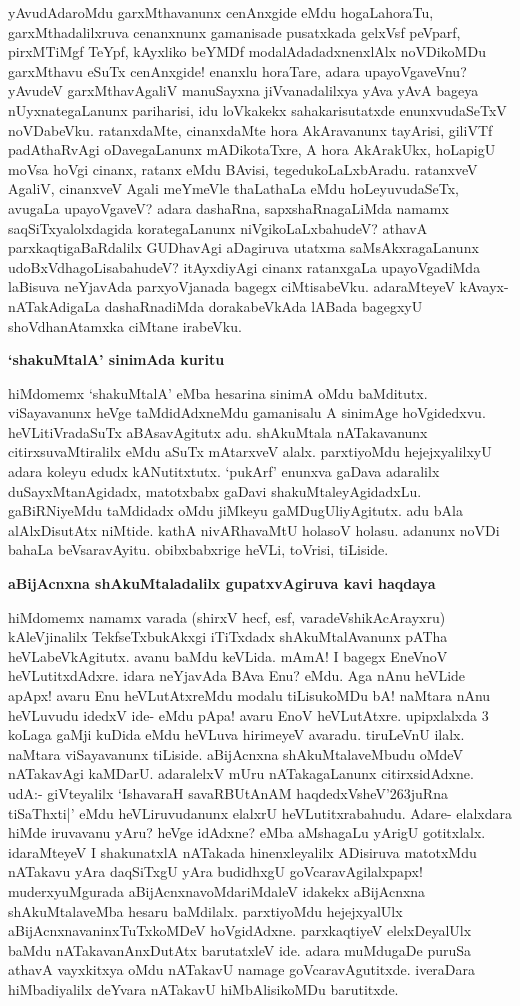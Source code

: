 yAvudAdaroMdu garxMthavanunx cenAnxgide eMdu hogaLahoraTu, garxMthadalilxruva cenanxnunx gamanisade pusatxkada gelxVsf peVparf, pirxMTiMgf TeYpf, kAyxliko beYMDf modalAdadadxnenxlAlx noVDikoMDu garxMthavu eSuTx cenAnxgide! enanxlu horaTare, adara upayoVgaveVnu? yAvudeV garxMthavAgaliV manuSayxna jiVvanadalilxya yAva yAvA bageya nUyxnategaLanunx pariharisi, idu loVkakekx sahakarisutatxde enunxvudaSeTxV noVDabeVku. ratanxdaMte, cinanxdaMte hora AkAravanunx tayArisi, giliVTf padAthaRvAgi oDavegaLanunx mADikotaTxre, A hora AkArakUkx, hoLapigU moVsa hoVgi cinanx, ratanx eMdu BAvisi, tegedukoLaLxbAradu. ratanxveV AgaliV, cinanxveV Agali meYmeVle thaLathaLa eMdu hoLeyuvudaSeTx, avugaLa upayoVgaveV? adara dashaRna, sapxshaRnagaLiMda namamx saqSiTxyalolxdagida korategaLanunx niVgikoLaLxbahudeV? athavA parxkaqtigaBaRdalilx GUDhavAgi aDagiruva utatxma saMsAkxragaLanunx udoBxVdhagoLisabahudeV? itAyxdiyAgi cinanx ratanxgaLa upayoVgadiMda laBisuva neYjavAda parxyoVjanada bagegx ciMtisabeVku. adaraMteyeV kAvayx-nATakAdigaLa dashaRnadiMda dorakabeVkAda lABada bagegxyU shoVdhanAtamxka ciMtane irabeVku.

\noindent
{\bf\large{`shakuMtalA' sinimAda kuritu}}\label{page234}

hiMdomemx `shakuMtalA' eMba hesarina sinimA oMdu baMditutx. viSayavanunx heVge taMdidAdxneMdu gamanisalu A sinimAge hoVgidedxvu. heVLitiVradaSuTx aBAsavAgitutx adu. shAkuMtala nATakavanunx citirxsuvaMtiralilx eMdu aSuTx mAtarxveV alalx. parxtiyoMdu hejejxyalilxyU adara koleyu edudx kANutitxtutx. `pukArf' enunxva gaDava adaralilx duSayxMtanAgidadx, matotxbabx gaDavi shakuMtaleyAgidadxLu. gaBiRNiyeMdu taMdidadx oMdu jiMkeyu gaMDugUliyAgitutx. adu bAla alAlxDisutAtx niMtide. kathA nivARhavaMtU holasoV holasu. adanunx noVDi bahaLa beVsaravAyitu. obibxbabxrige heVLi, toVrisi, tiLiside.

\noindent
{\bf\large{aBijAcnxna shAkuMtaladalilx gupatxvAgiruva kavi haqdaya}}\label{page234}

hiMdomemx namamx varada (shirxV hecf, esf, varadeVshikAcArayxru) kAleVjinalilx TekfseTxbukAkxgi iTiTxdadx shAkuMtalAvanunx pATha heVLabeVkAgitutx. avanu baMdu keVLida. mAmA! I bagegx EneVnoV heVLutitxdAdxre. idara neYjavAda BAva Enu? eMdu. Aga nAnu heVLide apApx! avaru Enu heVLutAtxreMdu modalu tiLisukoMDu bA! naMtara nAnu heVLuvudu idedxV ide- eMdu pApa! avaru EnoV heVLutAtxre. upipxlalxda 3 koLaga gaMji kuDida eMdu heVLuva hirimeyeV avaradu. tiruLeVnU ilalx. naMtara viSayavanunx tiLiside. aBijAcnxna shAkuMtalaveMbudu oMdeV nATakavAgi kaMDarU. adaralelxV mUru nATakagaLanunx citirxsidAdxne. udA:- giVteyalilx `IshavaraH savaRBUtAnAM haqdedxVsheV\char'263juRna tiSaThxti|'\label{235} eMdu heVLiruvudanunx elalxrU heVLutitxrabahudu. Adare- elalxdara hiMde iruvavanu yAru? heVge idAdxne? eMba aMshagaLu yArigU gotitxlalx. idaraMteyeV I shakunatxlA nATakada hinenxleyalilx ADisiruva matotxMdu nATakavu yAra daqSiTxgU yAra budidhxgU goVcaravAgilalxpapx! muderxyuMgurada aBijAcnxnavoMdariMdaleV idakekx aBijAcnxna shAkuMtalaveMba hesaru baMdilalx. parxtiyoMdu hejejxyalUlx aBijAcnxnavaninxTuTxkoMDeV hoVgidAdxne. parxkaqtiyeV elelxDeyalUlx baMdu nATakavanAnxDutAtx barutatxleV ide. adara muMdugaDe puruSa athavA vayxkitxya oMdu nATakavU namage goVcaravAgutitxde. iveraDara hiMbadiyalilx deYvara nATakavU hiMbAlisikoMDu barutitxde.

